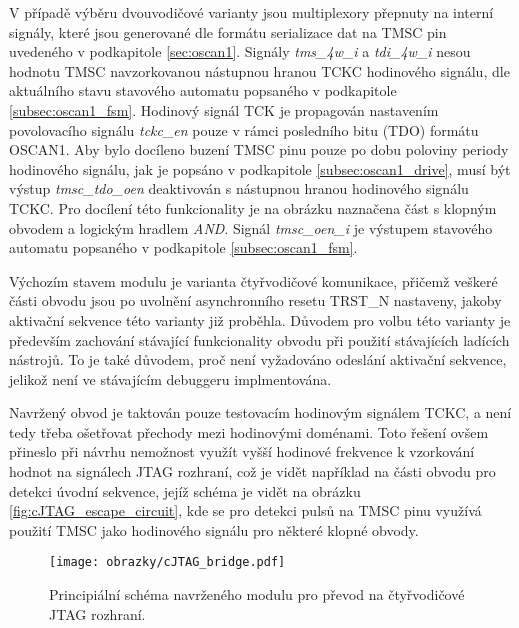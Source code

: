 V případě výběru dvouvodičové varianty jsou multiplexory přepnuty na interní signály, které jsou generované dle formátu serializace dat na \acs{TMSC} pin uvedeného v podkapitole \ref{sec:oscan1}. Signály \textit{tms\_4w\_i} a \textit{tdi\_4w\_i} nesou hodnotu \acs{TMSC} navzorkovanou nástupnou hranou \acs{TCKC} hodinového signálu, dle aktuálního stavu stavového automatu popsaného v podkapitole \ref{subsec:oscan1_fsm}. Hodinový signál TCK je propagován nastavením povolovacího signálu \textit{tckc\_en} pouze v rámci posledního bitu (TDO) formátu OSCAN1. Aby bylo docíleno buzení \acs{TMSC} pinu pouze po dobu poloviny periody hodinového signálu, jak je popsáno v podkapitole \ref{subsec:oscan1_drive}, musí být výstup \textit{tmsc\_tdo\_oen} deaktivován s nástupnou hranou hodinového signálu \acs{TCKC}. Pro docílení této funkcionality je na obrázku naznačena část s klopným obvodem a logickým hradlem \textit{AND}. Signál \textit{tmsc\_oen\_i} je výstupem stavového automatu popsaného v podkapitole \ref{subsec:oscan1_fsm}.

Výchozím stavem modulu je varianta čtyřvodičové komunikace, přičemž veškeré části obvodu jsou po uvolnění asynchronního resetu TRST\_N nastaveny, jakoby aktivační sekvence této varianty již proběhla. Důvodem pro volbu této varianty je především zachování stávající funkcionality obvodu při použití stávajících ladících nástrojů. To je také důvodem, proč není vyžadováno odeslání aktivační sekvence, jelikož není ve stávajícím debuggeru implmentována.

Navržený obvod je taktován pouze testovacím hodinovým signálem \acs{TCKC}, a není tedy třeba ošetřovat přechody mezi hodinovými doménami. Toto řešení ovšem přineslo při návrhu nemožnost využít vyšší hodinové frekvence k vzorkování hodnot na signálech \acs{JTAG} rozhraní, což je vidět například na části obvodu pro detekci úvodní sekvence, jejíž schéma je vidět na obrázku \ref{fig:cJTAG_escape_circuit}, kde se pro detekci pulsů na \acs{TMSC} pinu využívá použití \acs{TMSC} jako hodinového signálu pro některé klopné obvody.

\begin{figure}[!h]
  \begin{center}
    \texttt{[image: obrazky/cJTAG\_bridge.pdf]}
  \end{center}
  \caption{Principiální schéma navrženého modulu pro převod na čtyřvodičové \acs{JTAG} rozhraní.}
	\label{fig:cJTAG_bridge}
\end{figure}

